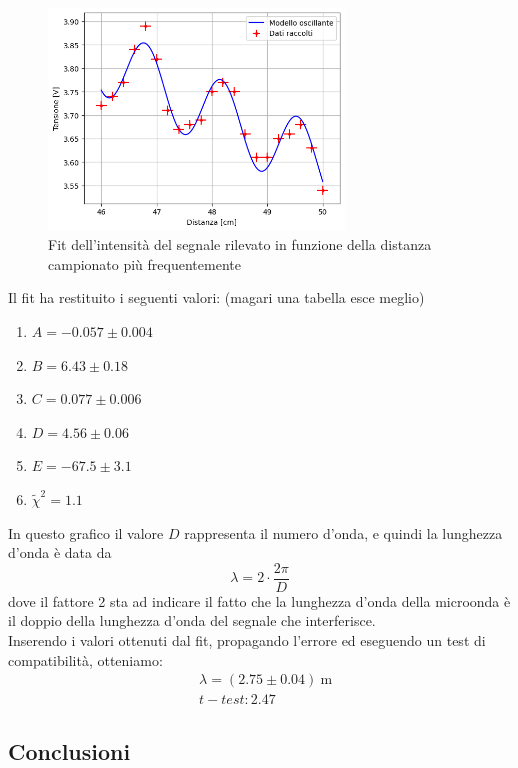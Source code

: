 \documentclass[letterpaper,12pt]{article}
\begin{document}
\begin{figure}[h!]
    \centering
    \includegraphics[width = 0.7\textwidth]{fit_distanza_ondulatori.png}
    \caption{Fit dell'intensità del segnale rilevato in funzione della distanza campionato più frequentemente}
    \label{fig:fit_distanza_ondulatori}
\end{figure}

Il fit ha restituito i seguenti valori: (magari una tabella esce meglio)
\begin{enumerate}
    \item $A = -0.057 \pm 0.004$
    \item $B = 6.43 \pm 0.18$
    \item $C = 0.077 \pm 0.006$
    \item $D = 4.56 \pm 0.06$
    \item $E = -67.5 \pm 3.1$
    \item $\tilde\chi^2 = 1.1$
\end{enumerate}

In questo grafico il valore $D$ rappresenta il numero d'onda, e quindi la lunghezza d'onda è data da 
$$\lambda = 2\cdot \frac{2\pi}{D}$$
dove il fattore 2 sta ad indicare il fatto che la lunghezza d'onda della microonda è il doppio della lunghezza d'onda del segnale che interferisce.\\
Inserendo i valori ottenuti dal fit, propagando l'errore ed eseguendo un test di compatibilità, otteniamo:
\begin{align*}
    &\lambda = (2.75 \pm 0.04)\ \text{m} \\
    &t-test : 2.47 
\end{align*}

\subsection{Conclusioni}
\end{document}
